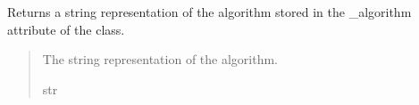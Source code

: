 \documentclass[letterpaper,10pt,english]{sphinxmanual}
\begin{document}
\begin{fulllineitems}
\begin{fulllineitems}
\begin{quote}
\begin{description}
\end{description}\end{quote}

\end{fulllineitems}


\begin{fulllineitems}
\label{\detokenize{source/_autosummary/HDF5_BLS_treat.Treat_backend:HDF5_BLS_treat.Treat_backend.silent_return_string_algorithm}}
\pysigstartsignatures
\pysiglinewithargsret
{}
{}
{}
\pysigstopsignatures
\sphinxAtStartPar
Returns a string representation of the algorithm stored in the \_algorithm attribute of the class.
\begin{quote}\begin{description}
\sphinxAtStartPar
The string representation of the algorithm.

\sphinxAtStartPar
str

\end{description}\end{quote}

\end{fulllineitems}



\end{fulllineitems}
\end{document}
